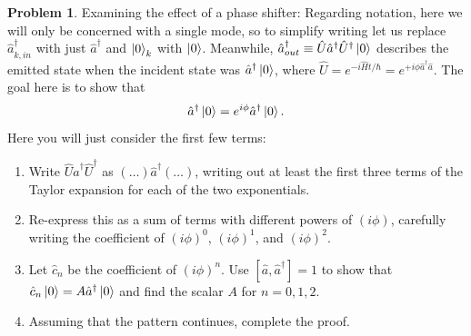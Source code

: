 \documentclass[10pt]{article}
\theoremstyle{definition}
\newtheorem{problem}{Problem}
\begin{document}
\begin{problem}
Examining the effect of a phase shifter:
Regarding notation, here we will only be concerned with a single mode, so to simplify writing
let us replace $\hat{a}_{k,in}^\dagger$ with just $\hat{a}^\dagger$ and $\ket{0}_k$ with $\ket{0}$.
Meanwhile, $\hat{a}_{out}^\dagger\equiv \hat{U}\hat{a}^\dagger\hat{U}^\dagger\ket{0}$ describes the emitted state when the incident state was
$\hat{a}^\dagger\ket{0}$, where $\hat{U}=e^{-i\hat{H}t/\hbar}=e^{+i\phi\hat{a}^\dagger\hat{a}}$.
The goal here is to show that
$$\hat{a}^\dagger\ket{0}=e^{i\phi}\hat{a}^\dagger\ket{0}.$$
Here you will just consider the first few terms:
\begin{enumerate}[label=(\alph*)]
  \item Write $\hat{U}\hat{a}^\dagger\hat{U}^\dagger$ as $(\dots)\hat{a}^\dagger(\dots)$, writing out at least the first three terms of the Taylor expansion for
        each of the two exponentials.
  \item Re-express this as a sum of terms with different powers of $(i\phi)$, carefully writing the coefficient of $(i\phi)^0$, $(i\phi)^1$, and $(i\phi)^2$.
  \item Let $\hat{c}_n$ be the coefficient of $(i\phi)^n$. Use $\left[\hat{a},\hat{a}^\dagger\right]=1$ to show that $\hat{c}_n\ket{0}=A\hat{a}^\dagger\ket{0}$
        and find the scalar $A$ for $n=0,1,2$.
  \item Assuming that the pattern continues, complete the proof.
\end{enumerate}
\end{problem}
\end{document}
